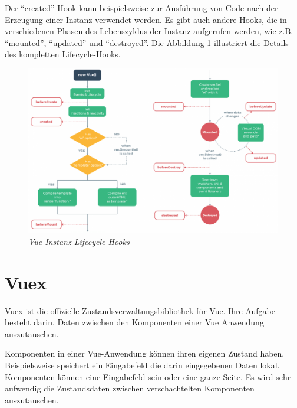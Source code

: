 Der \enquote{created} Hook kann beispielsweise zur Ausführung von Code nach der Erzeugung einer Instanz verwendet werden. Es gibt auch andere Hooks, die in verschiedenen Phasen des Lebenszyklus der Instanz aufgerufen werden, wie z.B. \enquote{mounted}, \enquote{updated} und \enquote{destroyed}. Die Abbildung \ref{fig:Organisation von Komponenten} illustriert die Details des kompletten Lifecycle-Hooks.

\begin{figure}[H]
  \centering
  \includegraphics[width=1\textwidth]{Bilder/img/lifecycle_.png}  
  \caption{ \textit{Vue Instanz-Lifecycle Hooks} \cite{InstancVue:Online}}%
\label{fig:Organisation von Komponenten}
\end{figure}







\section{Vuex }
\label{sec:Vuex}
Vuex ist die offizielle Zustandsverwaltungsbibliothek für Vue. Ihre Aufgabe besteht darin, Daten zwischen den Komponenten einer Vue Anwendung auszutauschen.

Komponenten in einer Vue-Anwendung können ihren eigenen Zustand haben. Beispielsweise speichert ein Eingabefeld die darin eingegebenen Daten lokal. Komponenten können eine Eingabefeld sein oder eine ganze Seite. Es wird sehr aufwendig die Zustandsdaten zwischen verschachtelten Komponenten auszutauschen.

